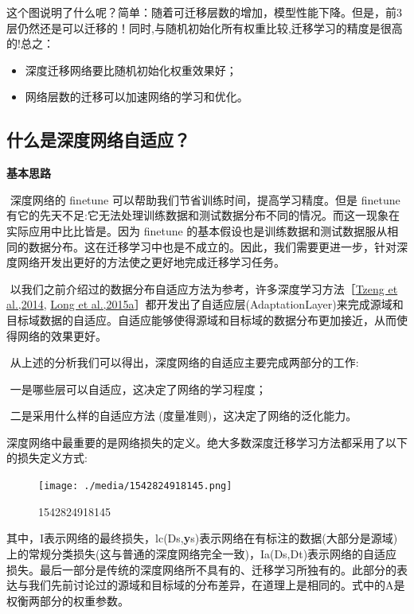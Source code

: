 ​
这个图说明了什么呢？简单：随着可迁移层数的增加，模型性能下降。但是，前3层仍然还是可以迁移的！同时,与随机初始化所有权重比较,迁移学习的精度是很高的!总之：

\begin{itemize}
\item
  深度迁移网络要比随机初始化权重效果好；
\item
  网络层数的迁移可以加速网络的学习和优化。
\end{itemize}

\subsection{什么是深度网络自适应？}\label{ux4ec0ux4e48ux662fux6df1ux5ea6ux7f51ux7edcux81eaux9002ux5e94}

\textbf{基本思路}

​ 深度网络的 finetune 可以帮助我们节省训练时间，提高学习精度。但是
finetune
有它的先天不足:它无法处理训练数据和测试数据分布不同的情况。而这一现象在实际应用中比比皆是。因为
finetune
的基本假设也是训练数据和测试数据服从相同的数据分布。这在迁移学习中也是不成立的。因此，我们需要更进一步，针对深度网络开发出更好的方法使之更好地完成迁移学习任务。

​
以我们之前介绍过的数据分布自适应方法为参考，许多深度学习方法［\protect\hyperlink{bookmark307}{Tzeng
et al.,2014}, \protect\hyperlink{bookmark275}{Long et
al.,2015a}］都开发出了自适应层(AdaptationLayer)来完成源域和目标域数据的自适应。自适应能够使得源域和目标域的数据分布更加接近，从而使得网络的效果更好。

​ 从上述的分析我们可以得出，深度网络的自适应主要完成两部分的工作:

​ 一是哪些层可以自适应，这决定了网络的学习程度；

​ 二是采用什么样的自适应方法 (度量准则)，这决定了网络的泛化能力。

​
深度网络中最重要的是网络损失的定义。绝大多数深度迁移学习方法都采用了以下的损失定义方式:

\begin{figure}
\centering
\texttt{[image: ./media/1542824918145.png]}
\caption{1542824918145}
\end{figure}

​
其中，I表示网络的最终损失，lc(Ds,\textbf{y}s)表示网络在有标注的数据(大部分是源域)上的常规分类损失(这与普通的深度网络完全一致)，Ia(Ds,Dt)表示网络的自适应损失。最后一部分是传统的深度网络所不具有的、迁移学习所独有的。此部分的表达与我们先前讨论过的源域和目标域的分布差异，在道理上是相同的。式中的A是权衡两部分的权重参数。

